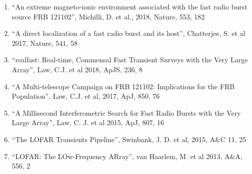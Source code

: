 \documentclass[11pt]{article}
\begin{document}
\begin{enumerate}

    \item ``An extreme magneto-ionic environment associated with the fast radio burst source FRB 121102'', Michilli, D. et al., 2018, Nature, 553, 182
    
    
    \item ``A direct localization of a fast radio burst and its host'', Chatterjee, S. et al 2017, Nature, 541, 58
    


    \item ``realfast: Real-time, Commensal Fast Transient Surveys with the Very Large Array'', Law, C.J. et al 2018, ApJS, 236, 8

    \item ``A Multi-telescope Campaign on FRB 121102: Implications for the FRB Population'', Law, C.J. et al, 2017, ApJ, 850, 76


    \item ``A Millisecond Interferometric Search for Fast Radio Bursts with the Very Large Array'', Law, C. J. et al 2015, ApJ, 807, 16

    \item ``The LOFAR Transients Pipeline'', Swinbank, J. D. et al, 2015, A\&C 11, 25


    \item ``LOFAR: The LOw-Frequency ARray'', van Haarlem, M. et al 2013, A\&A, 556, 2


\end{enumerate}
\end{document}
